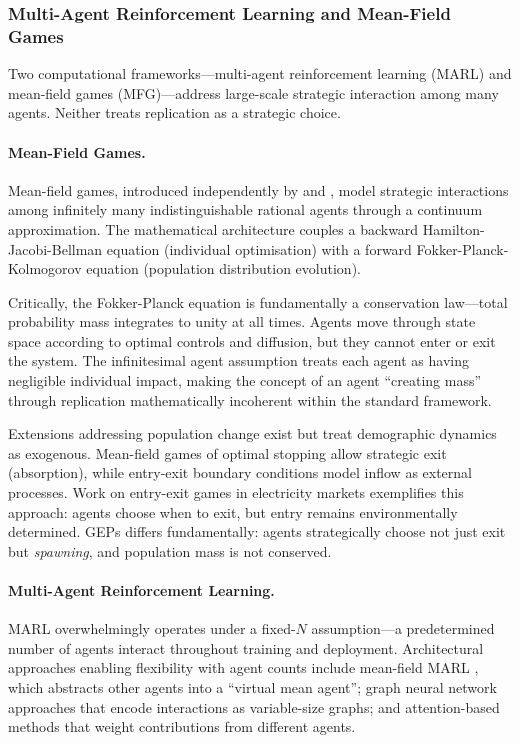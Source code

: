 \documentclass[12pt]{article}
\begin{document}
\subsubsection{Multi-Agent Reinforcement Learning and Mean-Field Games}

Two computational frameworks---multi-agent reinforcement learning (MARL) and mean-field games (MFG)---address large-scale strategic interaction among many agents. Neither treats replication as a strategic choice.

\paragraph{Mean-Field Games.}
Mean-field games, introduced independently by \citet{lasry2007} and \citet{huang2006}, model strategic interactions among infinitely many indistinguishable rational agents through a continuum approximation. The mathematical architecture couples a backward Hamilton-Jacobi-Bellman equation (individual optimisation) with a forward Fokker-Planck-Kolmogorov equation (population distribution evolution).

Critically, the Fokker-Planck equation is fundamentally a conservation law---total probability mass integrates to unity at all times. Agents move through state space according to optimal controls and diffusion, but they cannot enter or exit the system. The infinitesimal agent assumption treats each agent as having negligible individual impact, making the concept of an agent ``creating mass'' through replication mathematically incoherent within the standard framework.

Extensions addressing population change exist but treat demographic dynamics as exogenous. Mean-field games of optimal stopping allow strategic exit (absorption), while entry-exit boundary conditions model inflow as external processes. Work on entry-exit games in electricity markets exemplifies this approach: agents choose when to exit, but entry remains environmentally determined. GEPs differs fundamentally: agents strategically choose not just exit but \emph{spawning}, and population mass is not conserved.

\paragraph{Multi-Agent Reinforcement Learning.}
MARL overwhelmingly operates under a fixed-$N$ assumption---a predetermined number of agents interact throughout training and deployment. Architectural approaches enabling flexibility with agent counts include mean-field MARL \citep{yang2018}, which abstracts other agents into a ``virtual mean agent''; graph neural network approaches that encode interactions as variable-size graphs; and attention-based methods that weight contributions from different agents.
\end{document}

